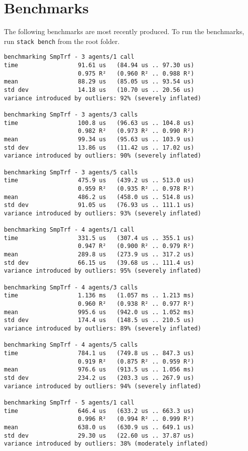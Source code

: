 \newpage
\section{Benchmarks}

The following benchmarks are most recently produced.
To run the benchmarks, run \texttt{stack bench} from the root folder.

\begin{verbatim}
benchmarking SmpTrf - 3 agents/1 call
time                 91.61 us   (84.94 us .. 97.30 us)
                     0.975 R²   (0.960 R² .. 0.988 R²)
mean                 88.29 us   (85.05 us .. 93.54 us)
std dev              14.18 us   (10.70 us .. 20.56 us)
variance introduced by outliers: 92% (severely inflated)

benchmarking SmpTrf - 3 agents/3 calls
time                 100.8 us   (96.63 us .. 104.8 us)
                     0.982 R²   (0.973 R² .. 0.990 R²)
mean                 99.34 us   (95.63 us .. 103.9 us)
std dev              13.86 us   (11.42 us .. 17.02 us)
variance introduced by outliers: 90% (severely inflated)

benchmarking SmpTrf - 3 agents/5 calls
time                 475.9 us   (439.2 us .. 513.0 us)
                     0.959 R²   (0.935 R² .. 0.978 R²)
mean                 486.2 us   (458.0 us .. 514.8 us)
std dev              91.05 us   (76.93 us .. 111.1 us)
variance introduced by outliers: 93% (severely inflated)

benchmarking SmpTrf - 4 agents/1 call
time                 331.5 us   (307.4 us .. 355.1 us)
                     0.947 R²   (0.900 R² .. 0.979 R²)
mean                 289.8 us   (273.9 us .. 317.2 us)
std dev              66.15 us   (39.68 us .. 111.4 us)
variance introduced by outliers: 95% (severely inflated)

benchmarking SmpTrf - 4 agents/3 calls
time                 1.136 ms   (1.057 ms .. 1.213 ms)
                     0.960 R²   (0.938 R² .. 0.977 R²)
mean                 995.6 us   (942.0 us .. 1.052 ms)
std dev              174.4 us   (148.5 us .. 210.5 us)
variance introduced by outliers: 89% (severely inflated)

benchmarking SmpTrf - 4 agents/5 calls
time                 784.1 us   (749.8 us .. 847.3 us)
                     0.919 R²   (0.875 R² .. 0.959 R²)
mean                 976.6 us   (913.5 us .. 1.056 ms)
std dev              234.2 us   (203.3 us .. 267.9 us)
variance introduced by outliers: 94% (severely inflated)

benchmarking SmpTrf - 5 agents/1 call
time                 646.4 us   (633.2 us .. 663.3 us)
                     0.996 R²   (0.994 R² .. 0.999 R²)
mean                 638.0 us   (630.9 us .. 649.1 us)
std dev              29.30 us   (22.60 us .. 37.87 us)
variance introduced by outliers: 38% (moderately inflated)


\end{verbatim}
